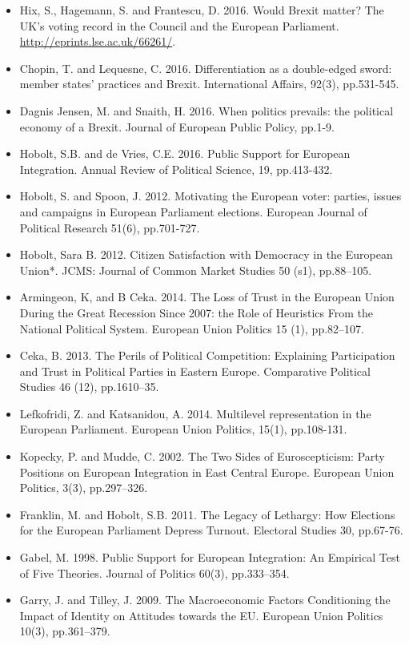 \begin{itemize}
	\item Hix, S., Hagemann, S. and Frantescu, D. 2016. Would Brexit matter? The UK’s voting record in the Council and the European Parliament. \url{http://eprints.lse.ac.uk/66261/}.
	\item Chopin, T. and Lequesne, C. 2016. Differentiation as a double-edged sword: member states’ practices and Brexit. International Affairs, 92(3), pp.531-545.
	\item Dagnis Jensen, M. and Snaith, H. 2016. When politics prevails: the political economy of a Brexit. Journal of European Public Policy, pp.1-9.
	\item Hobolt, S.B. and de Vries, C.E. 2016. Public Support for European Integration. Annual Review of Political Science, 19, pp.413-432.
	\item Hobolt, S. and Spoon, J. 2012. Motivating the European voter: parties, issues and campaigns in European Parliament elections. European Journal of Political Research 51(6), pp.701-727.
	\item Hobolt, Sara B. 2012. Citizen Satisfaction with Democracy in the European Union*. JCMS: Journal of Common Market Studies 50 (s1), pp.88–105.
	\item Armingeon, K, and B Ceka. 2014. The Loss of Trust in the European Union During the Great Recession Since 2007: the Role of Heuristics From the National Political System. European Union Politics 15 (1), pp.82–107.
	\item Ceka, B. 2013. The Perils of Political Competition: Explaining Participation and Trust in Political Parties in Eastern Europe. Comparative Political Studies 46 (12), pp.1610–35.
	\item Lefkofridi, Z. and Katsanidou, A. 2014. Multilevel representation in the European Parliament. European Union Politics, 15(1), pp.108-131.
	\item Kopecky, P. and Mudde, C. 2002. The Two Sides of Euroscepticism: Party Positions on European Integration in East Central Europe. European Union Politics, 3(3), pp.297–326.
	\item Franklin, M. and Hobolt, S.B. 2011. The Legacy of Lethargy: How Elections for the European Parliament Depress Turnout. Electoral Studies 30, pp.67-76.
	\item Gabel, M. 1998. Public Support for European Integration: An Empirical Test of Five Theories. Journal of Politics 60(3), pp.333–354.
	\item Garry, J. and Tilley, J. 2009. The Macroeconomic Factors Conditioning the Impact of Identity on Attitudes towards the EU. European Union Politics 10(3), pp.361–379.

\end{itemize}
